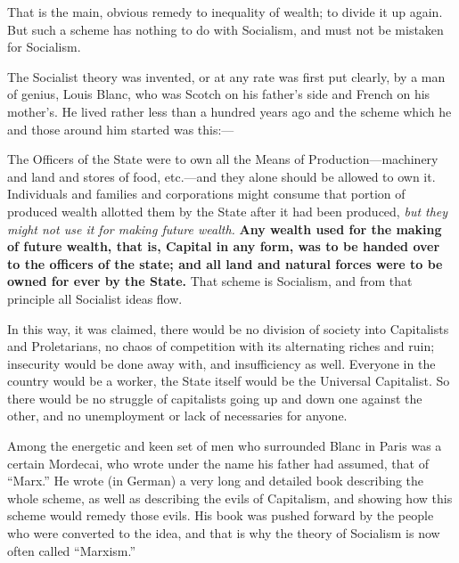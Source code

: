 \documentclass{book}
\begin{document}
That is the main, obvious remedy to inequality of wealth; to divide it up again. But such a scheme has nothing to do with Socialism, and must not be mistaken for Socialism.

The Socialist theory was invented, or at any rate was first put clearly, by a man of genius, Louis Blanc, who was Scotch on his father’s side and French on his mother’s. He lived rather less than a hundred years ago and the scheme which he and those around him started was this:—

The Officers of the State were to own all the Means of Production—machinery and land and stores of food, etc.—and they alone should be allowed to own it. Individuals and families and corporations might consume that portion of produced wealth allotted them by the State after it had been produced, \emph{but they might not use it for making future wealth.} \textbf{Any wealth used for the making of future wealth, that is, Capital in any form, was to be handed over to the officers of the state; and all land and natural forces were to be owned for ever by the State.} That scheme is Socialism, and from that principle all Socialist ideas flow.

In this way, it was claimed, there would be no division of society into Capitalists and Proletarians, no chaos of competition with its alternating riches and ruin; insecurity would be done away with, and insufficiency as well. Everyone in the country would be a worker, the State itself would be the Universal Capitalist. So there would be no struggle of capitalists going up and down one against the other, and no unemployment or lack of necessaries for anyone.

Among the energetic and keen set of men who surrounded Blanc in Paris was a certain Mordecai, who wrote under the name his father had assumed, that of “Marx.” He wrote (in German) a very long and detailed book describing the whole scheme, as well as describing the evils of Capitalism, and showing how this scheme would remedy those evils. His book was pushed forward by the people who were converted to the idea, and that is why the theory of Socialism is now often called “Marxism.”
\end{document}
